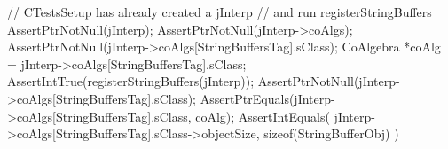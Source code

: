 
\startCTest
  // CTestsSetup has already created a jInterp
  // and run registerStringBuffers
  AssertPtrNotNull(jInterp);
  AssertPtrNotNull(jInterp->coAlgs);
  AssertPtrNotNull(jInterp->coAlgs[StringBuffersTag].sClass);
  CoAlgebra *coAlg = jInterp->coAlgs[StringBuffersTag].sClass;
  AssertIntTrue(registerStringBuffers(jInterp));
  AssertPtrNotNull(jInterp->coAlgs[StringBuffersTag].sClass);
  AssertPtrEquals(jInterp->coAlgs[StringBuffersTag].sClass, coAlg);
  AssertIntEquals(
    jInterp->coAlgs[StringBuffersTag].sClass->objectSize,
    sizeof(StringBufferObj)
  )
\stopCTest
\stopTestCase
\stopTestSuite
